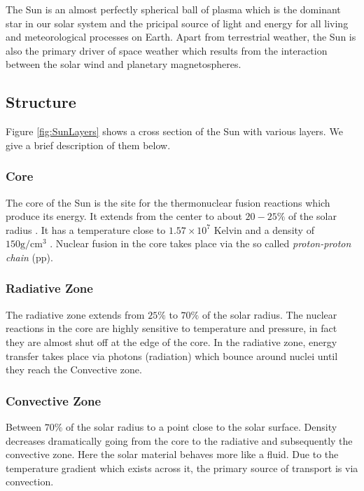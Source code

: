 The Sun is an almost perfectly spherical ball of plasma which is the dominant star in our solar system and 
the pricipal source of light and energy for all living and meteorological processes on Earth. Apart from 
terrestrial weather, the Sun is also the primary driver of space weather which results from the interaction 
between the solar wind and planetary magnetospheres.

\subsection*{Structure}

Figure \ref{fig:SunLayers} shows a cross section of the Sun with various layers. We give a brief description 
of them below.


\subsubsection*{Core}

The core of the Sun is the site for the thermonuclear fusion reactions which produce its energy. It extends 
from the center to about $20-25\%$ of the solar radius \citep{SolarAct}. It has a temperature close to 
$1.57 \times 10^7$ Kelvin and a density of $150 \text{g}/\text{cm}^3$ \citep{SolarCore}. Nuclear fusion in the core 
takes place via the so called \emph{proton-proton chain} (pp).

\subsubsection*{Radiative Zone}

The radiative zone extends from $25\%$ to $70\%$ of the solar radius. The nuclear reactions in the core are 
highly sensitive to temperature and pressure, in fact they are almost shut off at the edge of the core. 
In the radiative zone, energy transfer takes place via photons (radiation) which bounce around nuclei until 
they reach the Convective zone.

\subsubsection*{Convective Zone}

Between $70\%$ of the solar radius to a point close to the solar surface. Density decreases dramatically going 
from the core to the radiative and subsequently the convective zone. Here the solar material behaves more 
like a fluid. Due to the temperature gradient which exists across it, the primary source of transport is 
via convection.

